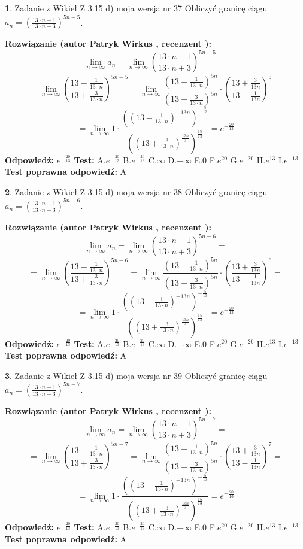 \documentclass[12pt, a4paper]{article}
\theoremstyle{definition} %
\newtheorem{zad}{}
\newcommand{\zadStart}[1]{\begin{zad}#1\newline}
\newcommand{\zadStop}{\end{zad}}
\newcommand{\rozwStart}[2]{\noindent \textbf{Rozwiązanie (autor #1 , recenzent #2): }\newline}
\newcommand{\rozwStop}{\newline}
\newcommand{\odpStart}{\noindent \textbf{Odpowiedź:}\newline}
\newcommand{\odpStop}{\newline}
\newcommand{\testStart}{\noindent \textbf{Test:}\newline}
\newcommand{\testStop}{\newline}
\newcommand{\kluczStart}{\noindent \textbf{Test poprawna odpowiedź:}\newline}
\newcommand{\kluczStop}{\newline}
\begin{document}
\zadStart{Zadanie z Wikieł Z 3.15 d) moja wersja nr 37}
Obliczyć granicę ciągu $a_{n}=(\frac{13\cdot n - 1}{13 \cdot n + 3})^{5n-5}$.
\zadStop
\rozwStart{Patryk Wirkus}{}
$$\lim\limits_{n\to\infty} a_{n} = \lim\limits_{n\to\infty}(\frac{13\cdot n - 1}{13 \cdot n + 3})^{5n-5}=$$
$$=\lim\limits_{n\to\infty}(\frac{13 - \frac{1}{13\cdot n}}{13 + \frac{3}{13 \cdot n}})^{5n-5}=\lim\limits_{n\to\infty}\frac{(13 - \frac{1}{13\cdot n})^{5n}}{(13 + \frac{3}{13\cdot n})^{5n}} \cdot (\frac{13+\frac{3}{13n}}{13-\frac{1}{13n}})^{5}=$$
$$=\lim\limits_{n\to\infty} 1 \cdot \frac{((13-\frac{1}{13 \cdot n})^{-13n})^{-\frac{5}{13}}}{((13+\frac{3}{13 \cdot n})^{\frac{13n}{3}})^{\frac{15}{13}}} =e^{-\frac{20}{13}}$$
\rozwStop
\odpStart
$e^{-\frac{20}{13}}$
\odpStop
\testStart
A.$ e^{-\frac{20}{13}}$
B.$ e^{-\frac{20}{13}}$
C.$\infty$
D.$-\infty$
E.$0$
F.$e^{20}$
G.$e^{-20}$
H.$e^{13}$
I.$e^{-13}$
\testStop
\kluczStart
A
\kluczStop



\zadStart{Zadanie z Wikieł Z 3.15 d) moja wersja nr 38}
Obliczyć granicę ciągu $a_{n}=(\frac{13\cdot n - 1}{13 \cdot n + 3})^{5n-6}$.
\zadStop
\rozwStart{Patryk Wirkus}{}
$$\lim\limits_{n\to\infty} a_{n} = \lim\limits_{n\to\infty}(\frac{13\cdot n - 1}{13 \cdot n + 3})^{5n-6}=$$
$$=\lim\limits_{n\to\infty}(\frac{13 - \frac{1}{13\cdot n}}{13 + \frac{3}{13 \cdot n}})^{5n-6}=\lim\limits_{n\to\infty}\frac{(13 - \frac{1}{13\cdot n})^{5n}}{(13 + \frac{3}{13\cdot n})^{5n}} \cdot (\frac{13+\frac{3}{13n}}{13-\frac{1}{13n}})^{6}=$$
$$=\lim\limits_{n\to\infty} 1 \cdot \frac{((13-\frac{1}{13 \cdot n})^{-13n})^{-\frac{5}{13}}}{((13+\frac{3}{13 \cdot n})^{\frac{13n}{3}})^{\frac{15}{13}}} =e^{-\frac{20}{13}}$$
\rozwStop
\odpStart
$e^{-\frac{20}{13}}$
\odpStop
\testStart
A.$ e^{-\frac{20}{13}}$
B.$ e^{-\frac{20}{13}}$
C.$\infty$
D.$-\infty$
E.$0$
F.$e^{20}$
G.$e^{-20}$
H.$e^{13}$
I.$e^{-13}$
\testStop
\kluczStart
A
\kluczStop



\zadStart{Zadanie z Wikieł Z 3.15 d) moja wersja nr 39}
Obliczyć granicę ciągu $a_{n}=(\frac{13\cdot n - 1}{13 \cdot n + 3})^{5n-7}$.
\zadStop
\rozwStart{Patryk Wirkus}{}
$$\lim\limits_{n\to\infty} a_{n} = \lim\limits_{n\to\infty}(\frac{13\cdot n - 1}{13 \cdot n + 3})^{5n-7}=$$
$$=\lim\limits_{n\to\infty}(\frac{13 - \frac{1}{13\cdot n}}{13 + \frac{3}{13 \cdot n}})^{5n-7}=\lim\limits_{n\to\infty}\frac{(13 - \frac{1}{13\cdot n})^{5n}}{(13 + \frac{3}{13\cdot n})^{5n}} \cdot (\frac{13+\frac{3}{13n}}{13-\frac{1}{13n}})^{7}=$$
$$=\lim\limits_{n\to\infty} 1 \cdot \frac{((13-\frac{1}{13 \cdot n})^{-13n})^{-\frac{5}{13}}}{((13+\frac{3}{13 \cdot n})^{\frac{13n}{3}})^{\frac{15}{13}}} =e^{-\frac{20}{13}}$$
\rozwStop
\odpStart
$e^{-\frac{20}{13}}$
\odpStop
\testStart
A.$ e^{-\frac{20}{13}}$
B.$ e^{-\frac{20}{13}}$
C.$\infty$
D.$-\infty$
E.$0$
F.$e^{20}$
G.$e^{-20}$
H.$e^{13}$
I.$e^{-13}$
\testStop
\kluczStart
A
\kluczStop
\end{document}
